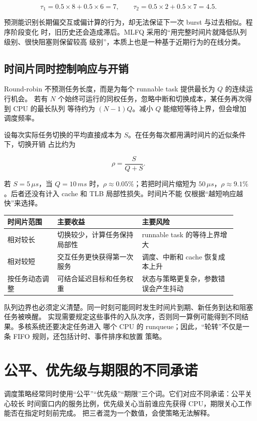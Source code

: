 \[
\tau_1=0.5\times 8+0.5\times 6=7,\qquad
\tau_2=0.5\times 2+0.5\times 7=4.5.
\]

预测能识别长期偏交互或偏计算的行为，却无法保证下一次 burst 与过去相似。程序阶段变化
时，旧历史还会造成滞后。MLFQ 采用的“用完整时间片就降低队列级别、很快阻塞则保留较高
级别”，本质上也是一种基于近期行为的在线分类。

\subsection{时间片同时控制响应与开销}

Round-robin 不预测任务长度，而是为每个 runnable task 提供最长为 $Q$ 的连续运行机会。
若有 $N$ 个始终可运行的同权任务，忽略中断和切换成本，某任务再次得到 CPU 的最长队列
等待约为 $(N-1)Q$。减小 $Q$ 能缩短等待上界，但会增加调度频率。

设每次实际任务切换的平均直接成本为 $S$。在任务每次都用满时间片的近似条件下，切换开销
占比约为

\[
\rho=\frac{S}{Q+S}.
\]

若 $S=5\,\mu s$，当 $Q=10\,ms$ 时，$\rho\approx0.05\%$；若把时间片缩短为
$50\,\mu s$，$\rho\approx9.1\%$。后者还没有计入 cache 和 TLB 局部性损失。时间片不能
仅根据“越短响应越快”来选择。

\begin{longtable}{|L{0.2\linewidth}|L{0.34\linewidth}|L{0.38\linewidth}|}
\toprule
时间片范围 & 主要收益 & 主要风险 \\
\midrule
相对较长 & 切换较少，计算任务保持局部性 & runnable task 的等待上界增大 \\\tablerowrule
相对较短 & 交互任务更快获得第一次服务 & 调度、中断和 cache 恢复成本上升 \\\tablerowrule
按任务动态调整 & 可结合延迟目标和任务权重 & 状态与策略更复杂，参数错误会产生抖动 \\
\bottomrule
\end{longtable}

队列边界也必须定义清楚。同一时刻可能同时发生时间片到期、新任务到达和阻塞任务被唤醒。
实现需要规定这些事件的入队次序，否则同一算例可能得到不同结果。多核系统还要决定任务进入
哪个 CPU 的 runqueue；因此，“轮转”不仅是一条 FIFO 规则，还包括计时、事件排序和放置
策略。

\section{公平、优先级与期限的不同承诺}

调度策略经常同时使用“公平”“优先级”“期限”三个词。它们对应不同承诺：公平关心较长
时间窗口内的服务比例，优先级关心当前谁应先获得 CPU，期限关心工作能否在指定时刻前完成。
把三者混为一个数值，会使策略无法解释。

